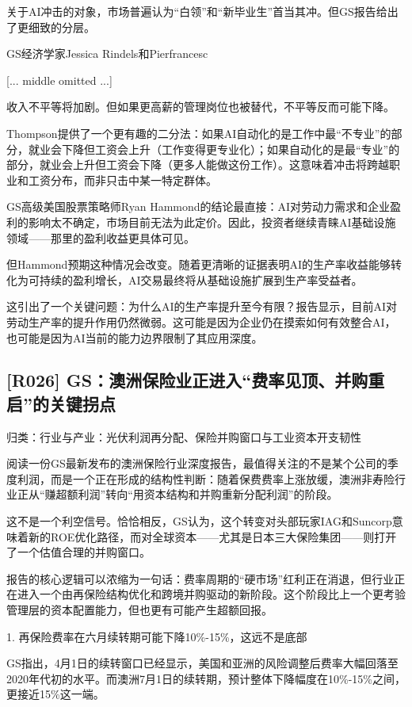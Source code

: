 \documentclass[11pt]{ctexart}
\begin{document}
关于AI冲击的对象，市场普遍认为“白领”和“新毕业生”首当其冲。但GS报告给出了更细致的分层。

GS经济学家Jessica Rindels和Pierfrancesc

[... middle omitted ...]

收入不平等将加剧。但如果更高薪的管理岗位也被替代，不平等反而可能下降。

Thompson提供了一个更有趣的二分法：如果AI自动化的是工作中最“不专业”的部分，就业会下降但工资会上升（工作变得更专业化）；如果自动化的是最“专业”的部分，就业会上升但工资会下降（更多人能做这份工作）。这意味着冲击将跨越职业和工资分布，而非只击中某一特定群体。

GS高级美国股票策略师Ryan Hammond的结论最直接：AI对劳动力需求和企业盈利的影响太不确定，市场目前无法为此定价。因此，投资者继续青睐AI基础设施领域——那里的盈利收益更具体可见。

但Hammond预期这种情况会改变。随着更清晰的证据表明AI的生产率收益能够转化为可持续的盈利增长，AI交易最终将从基础设施扩展到生产率受益者。

这引出了一个关键问题：为什么AI的生产率提升至今有限？报告显示，目前AI对劳动生产率的提升作用仍然微弱。这可能是因为企业仍在摸索如何有效整合AI，也可能是因为AI当前的能力边界限制了其应用深度。

\subsection{[R026] GS：澳洲保险业正进入“费率见顶、并购重启”的关键拐点}
{\small\color{refgray}归类：行业与产业：光伏利润再分配、保险并购窗口与工业资本开支韧性}

阅读一份GS最新发布的澳洲保险行业深度报告，最值得关注的不是某个公司的季度利润，而是一个正在形成的结构性判断：随着保费费率上涨放缓，澳洲非寿险行业正从“赚超额利润”转向“用资本结构和并购重新分配利润”的阶段。

这不是一个利空信号。恰恰相反，GS认为，这个转变对头部玩家IAG和Suncorp意味着新的ROE优化路径，而对全球资本——尤其是日本三大保险集团——则打开了一个估值合理的并购窗口。

报告的核心逻辑可以浓缩为一句话：费率周期的“硬市场”红利正在消退，但行业正在进入一个由再保险结构优化和跨境并购驱动的新阶段。这个阶段比上一个更考验管理层的资本配置能力，但也更有可能产生超额回报。

1. 再保险费率在六月续转期可能下降10\%-15\%，这远不是底部

GS指出，4月1日的续转窗口已经显示，美国和亚洲的风险调整后费率大幅回落至2020年代初的水平。而澳洲7月1日的续转期，预计整体下降幅度在10\%-15\%之间，更接近15\%这一端。
\end{document}
